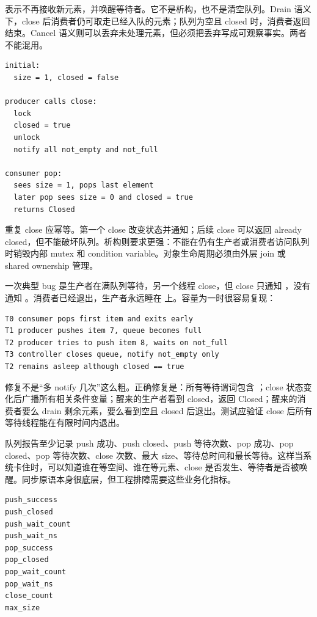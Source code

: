  表示不再接收新元素，并唤醒等待者。它不是析构，也不是清空队列。Drain 语义下，close 后消费者仍可取走已经入队的元素；队列为空且 closed 时，消费者返回结束。Cancel 语义则可以丢弃未处理元素，但必须把丢弃写成可观察事实。两者不能混用。

\begin{lstlisting}[numbers=none,caption={drain close 的事件链}]
initial:
  size = 1, closed = false

producer calls close:
  lock
  closed = true
  unlock
  notify all not_empty and not_full

consumer pop:
  sees size = 1, pops last element
  later pop sees size = 0 and closed = true
  returns Closed
\end{lstlisting}

重复 close 应幂等。第一个 close 改变状态并通知；后续 close 可以返回 already closed，但不能破坏队列。析构则要求更强：不能在仍有生产者或消费者访问队列时销毁内部 mutex 和 condition variable。对象生命周期必须由外层 join 或 shared ownership 管理。

一次典型 bug 是生产者在满队列等待，另一个线程 close，但 close 只通知 ，没有通知 。消费者已经退出，生产者永远睡在  上。容量为一时很容易复现：

\begin{lstlisting}[numbers=none,caption={关闭没有唤醒生产者的失败日志}]
T0 consumer pops first item and exits early
T1 producer pushes item 7, queue becomes full
T2 producer tries to push item 8, waits on not_full
T3 controller closes queue, notify not_empty only
T2 remains asleep although closed == true
\end{lstlisting}

修复不是“多 notify 几次”这么粗。正确修复是：所有等待谓词包含 ；close 状态变化后广播所有相关条件变量；醒来的生产者看到 closed，返回 Closed；醒来的消费者要么 drain 剩余元素，要么看到空且 closed 后退出。测试应验证 close 后所有等待线程能在有限时间内退出。

队列报告至少记录 push 成功、push closed、push 等待次数、pop 成功、pop closed、pop 等待次数、close 次数、最大 size、等待总时间和最长等待。这样当系统卡住时，可以知道谁在等空间、谁在等元素、close 是否发生、等待者是否被唤醒。同步原语本身很底层，但工程排障需要这些业务化指标。

\begin{lstlisting}[numbers=none,caption={QueueReport 的语义字段}]
push_success
push_closed
push_wait_count
push_wait_ns
pop_success
pop_closed
pop_wait_count
pop_wait_ns
close_count
max_size
\end{lstlisting}

